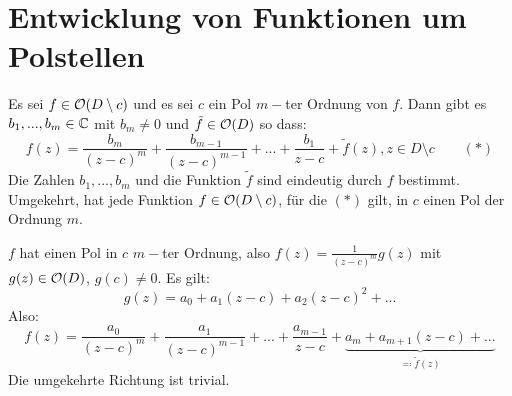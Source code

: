 \section{Entwicklung von Funktionen um Polstellen}
\begin{satz}
	Es sei $ f\in\mathcal O(D\setminus c) $ und es sei $ c $ ein Pol $ m- $ter Ordnung von $ f $. Dann gibt es $ b_1,...,b_m\in\mathbb{C} $ mit $ b_m\neq 0 $ und $ \tilde f\in\mathcal O(D) $  so dass:
	\[ f(z)=\frac{b_m}{(z-c)^m}+\frac{b_{m-1}}{(z-c)^{m-1}}+...+\frac{b_1}{z-c}+\tilde f(z), z\in D\setminus c\qquad (\ast) \]
	Die Zahlen $ b_1,...,b_m $ und die Funktion $ \tilde f $ sind eindeutig durch $ f $ bestimmt.\\
	Umgekehrt, hat jede Funktion $ f\in\mathcal O(D\setminus c) $, f\"ur die $ (\ast) $ gilt, in $ c $ einen Pol der Ordnung $ m $.
\end{satz}
\begin{beweis}
	$ f $ hat einen Pol in $ c $ $ m- $ter Ordnung, also $ f(z)=\frac{1}{(z-c)^m}g(z) $ mit $ g(z)\in\mathcal O(D) $, $ g(c)\neq 0 $. Es gilt:
	\[ g(z)=a_0+a_1(z-c)+a_2(z-c)^2+... \]
	Also:
	\[ f(z)=\frac{a_0}{(z-c)^m}+\frac{a_1}{(z-c)^{m-1}}+...+\frac{a_{m-1}}{z-c}+\underbrace{a_m+a_{m+1}(z-c)+...}_{\eqqcolon\tilde f(z)} \]
	Die umgekehrte Richtung ist trivial.
\end{beweis}
\newpage
